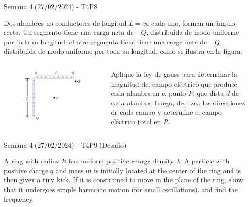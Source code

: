\begin{frame}{Semana 4 (27/02/2024) - T4P8}
  
  Dos alambres no conductores de longitud $L=\infty$ cada uno, forman un ángulo recto. Un segmento tiene una carga neta de $-Q$, distribuida de modo uniforme por toda su longitud; el otro segmento tiene tiene una carga neta de $+Q$, distribuida de modo uniforme por toda su longitud, como se ilustra en la figura.
    
    \begin{columns}
    
    
    \begin{figure}
        \centering
        \includegraphics[scale=0.25]{figures/t4p8.png}
    \end{figure}
    
    
    Aplique la ley de gauss para determinar la magnitud del campo el\'ectrico que produce cada alambre en el punto $P$, que dista $d$ de cada alambre. Luego, deduzca las direcciones de cada campo y determine el campo el\'ectrico total en $P$.
    
    \end{columns}
    
\end{frame}

\begin{frame}{Semana 4 (27/02/2024) - T4P9 (Desafío)}
  
  A ring with radius $R$ has uniform positive charge density $\lambda$. A particle with positive charge $q$ and mass $m$ is initially located at the center of the ring and is then given a tiny kick. If it is constrained to move in the plane of the ring, show that it undergoes simple harmonic motion (for small oscillations), and find the frequency.
    
\end{frame}